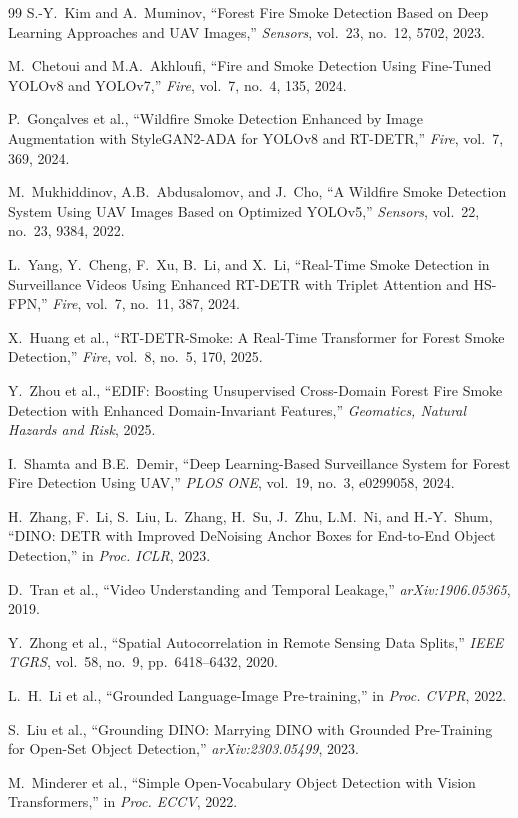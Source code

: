 \documentclass[10pt,twocolumn]{article}
\begin{document}
\begin{thebibliography}{99}
S.-Y.~Kim and A.~Muminov, ``Forest Fire Smoke Detection Based on Deep Learning Approaches and UAV Images,'' \textit{Sensors}, vol.~23, no.~12, 5702, 2023.

M.~Chetoui and M.A.~Akhloufi, ``Fire and Smoke Detection Using Fine-Tuned YOLOv8 and YOLOv7,'' \textit{Fire}, vol.~7, no.~4, 135, 2024.

P.~Gon{\c{c}}alves et al., ``Wildfire Smoke Detection Enhanced by Image Augmentation with StyleGAN2-ADA for YOLOv8 and RT-DETR,'' \textit{Fire}, vol.~7, 369, 2024.

M.~Mukhiddinov, A.B.~Abdusalomov, and J.~Cho, ``A Wildfire Smoke Detection System Using UAV Images Based on Optimized YOLOv5,'' \textit{Sensors}, vol.~22, no.~23, 9384, 2022.

L.~Yang, Y.~Cheng, F.~Xu, B.~Li, and X.~Li, ``Real-Time Smoke Detection in Surveillance Videos Using Enhanced RT-DETR with Triplet Attention and HS-FPN,'' \textit{Fire}, vol.~7, no.~11, 387, 2024.

X.~Huang et al., ``RT-DETR-Smoke: A Real-Time Transformer for Forest Smoke Detection,'' \textit{Fire}, vol.~8, no.~5, 170, 2025.

Y.~Zhou et al., ``EDIF: Boosting Unsupervised Cross-Domain Forest Fire Smoke Detection with Enhanced Domain-Invariant Features,'' \textit{Geomatics, Natural Hazards and Risk}, 2025.

I.~Shamta and B.E.~Demir, ``Deep Learning-Based Surveillance System for Forest Fire Detection Using UAV,'' \textit{PLOS ONE}, vol.~19, no.~3, e0299058, 2024.

H.~Zhang, F.~Li, S.~Liu, L.~Zhang, H.~Su, J.~Zhu, L.M.~Ni, and H.-Y.~Shum, ``DINO: DETR with Improved DeNoising Anchor Boxes for End-to-End Object Detection,'' in \textit{Proc. ICLR}, 2023.

D.~Tran et al., ``Video Understanding and Temporal Leakage,'' \textit{arXiv:1906.05365}, 2019.

Y.~Zhong et al., ``Spatial Autocorrelation in Remote Sensing Data Splits,'' \textit{IEEE TGRS}, vol.~58, no.~9, pp.~6418--6432, 2020.

L.~H.~Li et al., ``Grounded Language-Image Pre-training,'' in \textit{Proc. CVPR}, 2022.

S.~Liu et al., ``Grounding DINO: Marrying DINO with Grounded Pre-Training for Open-Set Object Detection,'' \textit{arXiv:2303.05499}, 2023.

M.~Minderer et al., ``Simple Open-Vocabulary Object Detection with Vision Transformers,'' in \textit{Proc. ECCV}, 2022.

\end{thebibliography}
\end{document}
